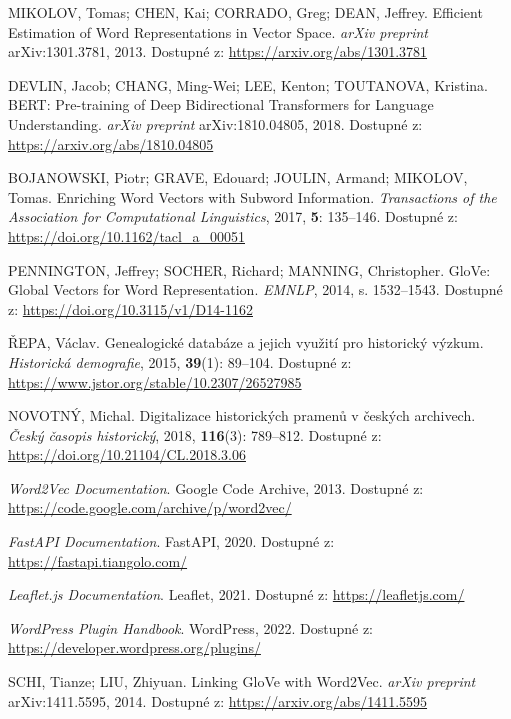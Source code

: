 \documentclass[czech, ba, kiv, he]{fasthesis}
\begin{document}
\begin{thebibliography}{20}

MIKOLOV, Tomas; CHEN, Kai; CORRADO, Greg; DEAN, Jeffrey.
Efficient Estimation of Word Representations in Vector Space.
\textit{arXiv preprint} arXiv:1301.3781, 2013.
Dostupné z: \url{https://arxiv.org/abs/1301.3781}

DEVLIN, Jacob; CHANG, Ming-Wei; LEE, Kenton; TOUTANOVA, Kristina.
BERT: Pre-training of Deep Bidirectional Transformers for Language Understanding.
\textit{arXiv preprint} arXiv:1810.04805, 2018.
Dostupné z: \url{https://arxiv.org/abs/1810.04805}

BOJANOWSKI, Piotr; GRAVE, Edouard; JOULIN, Armand; MIKOLOV, Tomas.
Enriching Word Vectors with Subword Information.
\textit{Transactions of the Association for Computational Linguistics}, 2017, \textbf{5}: 135--146.
Dostupné z: \url{https://doi.org/10.1162/tacl_a_00051}

PENNINGTON, Jeffrey; SOCHER, Richard; MANNING, Christopher.
GloVe: Global Vectors for Word Representation.
\textit{EMNLP}, 2014, s. 1532--1543.
Dostupné z: \url{https://doi.org/10.3115/v1/D14-1162}

ŘEPA, Václav.
Genealogické databáze a jejich využití pro historický výzkum.
\textit{Historická demografie}, 2015, \textbf{39}(1): 89--104.
Dostupné z: \url{https://www.jstor.org/stable/10.2307/26527985}

NOVOTNÝ, Michal.
Digitalizace historických pramenů v českých archivech.
\textit{Český časopis historický}, 2018, \textbf{116}(3): 789--812.
Dostupné z: \url{https://doi.org/10.21104/CL.2018.3.06}

\textit{Word2Vec Documentation}. Google Code Archive, 2013.
Dostupné z: \url{https://code.google.com/archive/p/word2vec/}

\textit{FastAPI Documentation}. FastAPI, 2020.
Dostupné z: \url{https://fastapi.tiangolo.com/}

\textit{Leaflet.js Documentation}. Leaflet, 2021.
Dostupné z: \url{https://leafletjs.com/}

\textit{WordPress Plugin Handbook}. WordPress, 2022.
Dostupné z: \url{https://developer.wordpress.org/plugins/}

SCHI, Tianze; LIU, Zhiyuan.
Linking GloVe with Word2Vec.
\textit{arXiv preprint} arXiv:1411.5595, 2014.
Dostupné z: \url{https://arxiv.org/abs/1411.5595}


\end{thebibliography}
\end{document}
